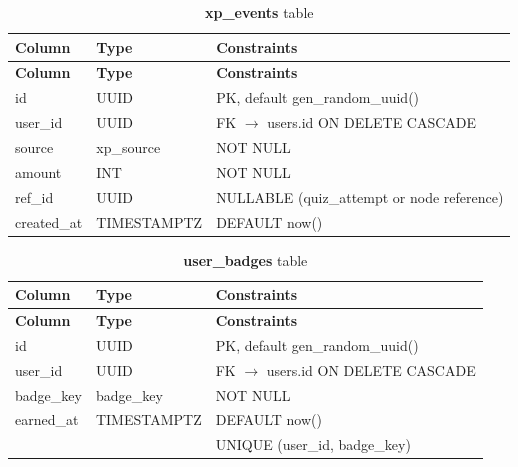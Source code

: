 \begin{longtable}{p{3cm}p{2.5cm}p{5cm}}
\caption{\textbf{xp\_events} table}
\label{tab:ch04_xp_events}\\
\toprule
\textbf{Column} & \textbf{Type} & \textbf{Constraints} \\
\midrule
\endfirsthead
\toprule
\textbf{Column} & \textbf{Type} & \textbf{Constraints} \\
\midrule
\endhead
id & UUID & PK, default gen\_random\_uuid() \\
user\_id & UUID & FK $\rightarrow$ users.id ON DELETE CASCADE \\
source & xp\_source & NOT NULL \\
amount & INT & NOT NULL \\
ref\_id & UUID & NULLABLE (quiz\_attempt or node reference) \\
created\_at & TIMESTAMPTZ & DEFAULT now() \\
\bottomrule
\end{longtable}

\begin{longtable}{p{3cm}p{2.5cm}p{5cm}}
\caption{\textbf{user\_badges} table}
\label{tab:ch04_user_badges}\\
\toprule
\textbf{Column} & \textbf{Type} & \textbf{Constraints} \\
\midrule
\endfirsthead
\toprule
\textbf{Column} & \textbf{Type} & \textbf{Constraints} \\
\midrule
\endhead
id & UUID & PK, default gen\_random\_uuid() \\
user\_id & UUID & FK $\rightarrow$ users.id ON DELETE CASCADE \\
badge\_key & badge\_key & NOT NULL \\
earned\_at & TIMESTAMPTZ & DEFAULT now() \\
 &  & UNIQUE (user\_id, badge\_key) \\
\bottomrule
\end{longtable}

